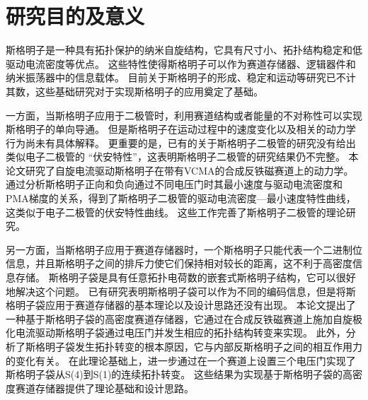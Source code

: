 \section{研究目的及意义}
斯格明子是一种具有拓扑保护的纳米自旋结构，它具有尺寸小、拓扑结构稳定和低驱动电流密度等优点。
这些特性使得斯格明子可以作为赛道存储器、逻辑器件和纳米振荡器中的信息载体。
目前关于斯格明子的形成、稳定和运动等研究已不计其数，这些基础研究对于实现斯格明子的应用奠定了基础。\par
一方面，当斯格明子应用于二极管时，利用赛道结构或者能量的不对称性可以实现斯格明子的单向导通。
但是斯格明子在运动过程中的速度变化以及相关的动力学行为尚未有具体解释。
更重要的是，已有的关于斯格明子二极管的研究没有给出类似电子二极管的 “伏安特性”，这表明斯格明子二极管的研究结果仍不完整。
本论文研究了自旋电流驱动斯格明子在带有VCMA的合成反铁磁赛道上的动力学。
通过分析斯格明子正向和负向通过不同电压门时其最小速度与驱动电流密度和PMA梯度的关系，得到了斯格明子二极管的驱动电流密度—最小速度特性曲线，这类似于电子二极管的伏安特性曲线。
这些工作完善了斯格明子二极管的理论研究。\par
另一方面，当斯格明子应用于赛道存储器时，一个斯格明子只能代表一个二进制位信息，并且斯格明子之间的排斥力使它们保持相对较长的距离，这不利于高密度信息存储。
斯格明子袋是具有任意拓扑电荷数的嵌套式斯格明子结构，它可以很好地解决这个问题。
已有研究表明斯格明子袋可以作为不同的编码信息，但是将斯格明子袋应用于赛道存储器的基本理论以及设计思路还没有出现。
本论文提出了一种基于斯格明子袋的高密度赛道存储器，它通过在合成反铁磁赛道上施加自旋极化电流驱动斯格明子袋通过电压门并发生相应的拓扑结构转变来实现。
此外，分析了斯格明子袋发生拓扑转变的根本原因，它与内部反斯格明子之间的相互作用力的变化有关。
在此理论基础上，进一步通过在一个赛道上设置三个电压门实现了斯格明子袋从S(4)到S(1)的连续拓扑转变。
这些结果为实现基于斯格明子袋的高密度赛道存储器提供了理论基础和设计思路。
\newpage